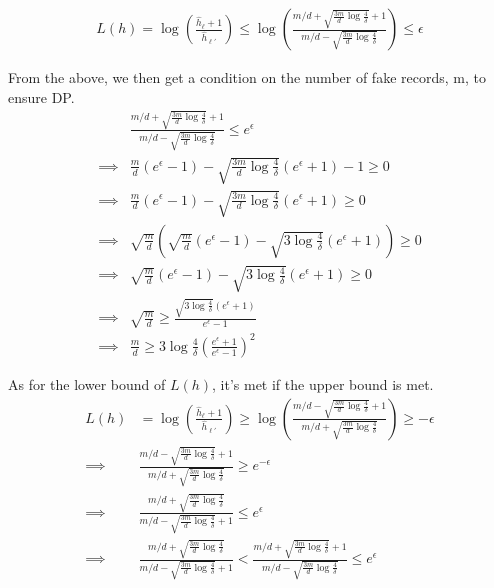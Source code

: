 \documentclass[11pt]{article}
\begin{document}
 \begin{align}
 L(h) =  \log  \left ( \frac{\hat{h}_\ell + 1}{\hat{h}_{\ell'}} \right ) \le \log  \left ( \frac{ m/d + \sqrt{  \frac{3m}{d} \log{\frac{4}{\delta}}} + 1}{  m/d - \sqrt{  \frac{3m}{d} \log{\frac{4}{\delta}}} } \right ) \le \epsilon 
\end{align}

From the above, we then get a condition on the number of fake records, m, to ensure DP.
 \begin{align*}
& \frac{ m/d + \sqrt{  \frac{3m}{d} \log{\frac{4}{\delta}}} + 1}{  m/d - \sqrt{  \frac{3m}{d} \log{\frac{4}{\delta}}}} \le e^\epsilon  \\
\implies & \frac{m}{d} (e^\epsilon - 1) -  \sqrt{  \frac{3m}{d} \log{\frac{4}{\delta}}} (e^\epsilon +1) - 1 \ge 0 \\
\implies & \frac{m}{d} (e^\epsilon - 1) -  \sqrt{  \frac{3m}{d} \log{\frac{4}{\delta}}} (e^\epsilon +1) \ge 0 \\
\implies &\sqrt{  \frac{m}{d}} \left ( \sqrt{  \frac{m}{d}} (e^\epsilon - 1)  - \sqrt{  3 \log{\frac{4}{\delta}}} (e^\epsilon +1) \right ) \ge 0 \\
\implies &\sqrt{  \frac{m}{d}} (e^\epsilon - 1)  - \sqrt{  3 \log{\frac{4}{\delta}}} (e^\epsilon +1)  \ge 0 \\
\implies &\sqrt{  \frac{m}{d}}  \ge  \frac { \sqrt{  3 \log{\frac{4}{\delta}}} (e^\epsilon +1)  } { e^\epsilon - 1 } \\
\implies & \frac{m}{d}  \ge 3\log {\frac{4}{\delta}} \left ( \frac{e^\epsilon +1}{e^\epsilon - 1} \right )^2
\end{align*}

As for the lower bound of $L(h)$, it's met if the upper bound is met.
 \begin{align*}
 L(h) & =  \log  \left ( \frac{\hat{h}_\ell + 1}{\hat{h}_{\ell'}} \right ) \ge \log  \left ( \frac{ m/d - \sqrt{  \frac{3m}{d} \log{\frac{4}{\delta}}} + 1}{  m/d + \sqrt{  \frac{3m}{d} \log{\frac{4}{\delta}}} } \right ) \ge - \epsilon  \\
\implies &  \frac{ m/d - \sqrt{  \frac{3m}{d} \log{\frac{4}{\delta}}} + 1}{  m/d + \sqrt{  \frac{3m}{d} \log{\frac{4}{\delta}}}} \ge e^{-\epsilon} \\
 \implies &  \frac{  m/d + \sqrt{  \frac{3m}{d} \log{\frac{4}{\delta}}}}  { m/d - \sqrt{  \frac{3m}{d} \log{\frac{4}{\delta}}} + 1} \le e^{\epsilon}  \\
\implies &   \frac{  m/d + \sqrt{  \frac{3m}{d} \log{\frac{4}{\delta}}}}  { m/d - \sqrt{  \frac{3m}{d} \log{\frac{4}{\delta}}} + 1} < \frac{ m/d + \sqrt{  \frac{3m}{d} \log{\frac{4}{\delta}}} + 1}{  m/d - \sqrt{  \frac{3m}{d} \log{\frac{4}{\delta}}}} \le e^{\epsilon} 
\end{align*}
\end{document}
